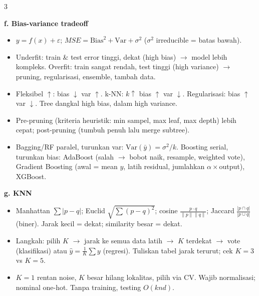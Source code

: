 \documentclass[8pt]{extarticle}
\newcommand{\sect}[1]{\par\vspace{1.5pt}\colorbox{black!12}{\parbox{\dimexpr\columnwidth-2\fboxsep}{\textbf{#1}}}\par\vspace{0.8pt}}
\begin{document}
\begin{multicols*}{3}
\sect{f. Bias-variance tradeoff}
\begin{itemize}
\item $y=f(x)+\varepsilon$; $MSE=\mathrm{Bias}^2+\mathrm{Var}+\sigma^2$ ($\sigma^2$ irreducible = batas bawah).
\item Underfit: train \& test error tinggi, dekat (high bias) $\to$ model lebih kompleks. Overfit: train sangat rendah, test tinggi (high variance) $\to$ pruning, regularisasi, ensemble, tambah data.
\item Fleksibel $\uparrow$: bias $\downarrow$ var $\uparrow$. k-NN: $k\uparrow$ bias $\uparrow$ var $\downarrow$. Regularisasi: bias $\uparrow$ var $\downarrow$. Tree dangkal high bias, dalam high variance.
\item Pre-pruning (kriteria heuristik: min sampel, max leaf, max depth) lebih cepat; post-pruning (tumbuh penuh lalu merge subtree).
\item Bagging/RF paralel, turunkan var: $\mathrm{Var}(\bar y)=\sigma^2/k$. Boosting serial, turunkan bias: AdaBoost (salah $\to$ bobot naik, resample, weighted vote), Gradient Boosting (awal = mean $y$, latih residual, jumlahkan $\alpha\times$output), XGBoost.
\end{itemize}

\sect{g. KNN}
\begin{itemize}
\item Manhattan $\sum|p-q|$; Euclid $\sqrt{\sum(p-q)^2}$; cosine $\frac{p\cdot q}{\|p\|\|q\|}$; Jaccard $\frac{|p\cap q|}{|p\cup q|}$ (biner). Jarak kecil = dekat; similarity besar = dekat.
\item Langkah: pilih $K$ $\to$ jarak ke semua data latih $\to$ $K$ terdekat $\to$ vote (klasifikasi) atau $\hat y=\frac1K\sum y$ (regresi). Tuliskan tabel jarak terurut; cek $K=3$ vs $K=5$.
\item $K=1$ rentan noise, $K$ besar hilang lokalitas, pilih via CV. Wajib normalisasi; nominal one-hot. Tanpa training, testing $O(knd)$.
\end{itemize}


\end{multicols*}
\end{document}
